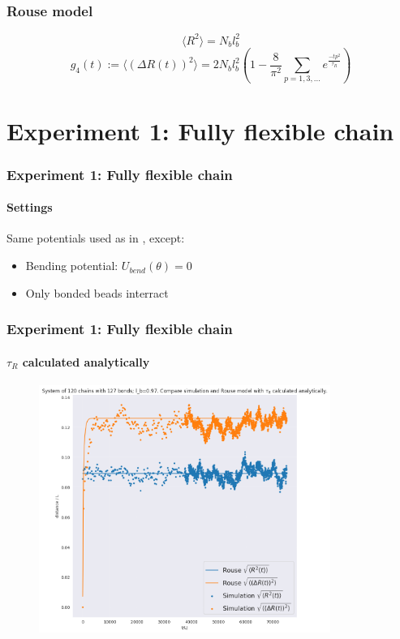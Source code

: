 \documentclass[handout]{beamer}
\newcommand{\mean}[1]{\langle #1 \rangle}
\begin{document}
\begin{frame}
    \frametitle{Rouse model}
    \begin{equation}
        \mean{R^2}=N_b l_b^2
    \end{equation}
    \begin{equation}
        g_4(t) := \mean{(\Delta R(t))^2} = 2 N_b l_b^2 (1-\frac{8}{\pi^2}\sum_{p=1,3,...}e^{\frac{-t p^2}{\tau_R}})
    \end{equation}

\end{frame}

\section{Experiment 1: Fully flexible chain}


\begin{frame}
    \frametitle{Experiment 1: Fully flexible chain}
    \framesubtitle{Settings}
    Same potentials used as in \cite[Section 2.1]{svaneborg_2020}, except:
    \begin{itemize}
        \item Bending potential: $U_{bend}(\theta)=0$
        \item Only bonded beads interract
    \end{itemize}
\end{frame}


\begin{frame}
    \frametitle{Experiment 1: Fully flexible chain}
    \framesubtitle{$\tau_R$ calculated analytically}

    \begin{figure}[h]
        \includegraphics[width=9.5cm]{./3-exp-fixed-param.png}
    \end{figure}
\end{frame}
\end{document}
